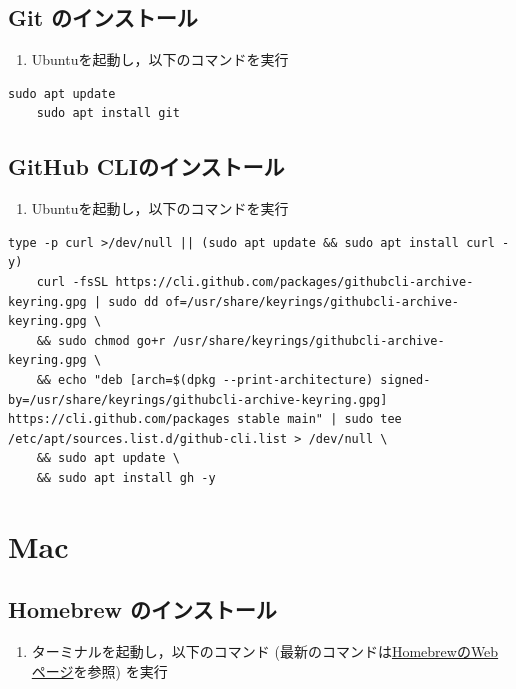 \section{Git のインストール}


\begin{enumerate}
\item Ubuntuを起動し，以下のコマンドを実行
\end{enumerate}


\begin{lstlisting}[style=codecell]
    sudo apt update
    sudo apt install git 
\end{lstlisting}


\section{GitHub CLIのインストール}


\begin{enumerate}
\item Ubuntuを起動し，以下のコマンドを実行
\end{enumerate}


\begin{lstlisting}[style=codecell]
    type -p curl >/dev/null || (sudo apt update && sudo apt install curl -y)
    curl -fsSL https://cli.github.com/packages/githubcli-archive-keyring.gpg | sudo dd of=/usr/share/keyrings/githubcli-archive-keyring.gpg \
    && sudo chmod go+r /usr/share/keyrings/githubcli-archive-keyring.gpg \
    && echo "deb [arch=$(dpkg --print-architecture) signed-by=/usr/share/keyrings/githubcli-archive-keyring.gpg] https://cli.github.com/packages stable main" | sudo tee /etc/apt/sources.list.d/github-cli.list > /dev/null \
    && sudo apt update \
    && sudo apt install gh -y
\end{lstlisting}



\chapter{Mac}


\section{Homebrew のインストール}

\begin{enumerate}
\item ターミナルを起動し，以下のコマンド (最新のコマンドは\href{https://brew.sh/ja/}{HomebrewのWebページ}を参照) を実行
\end{enumerate}

